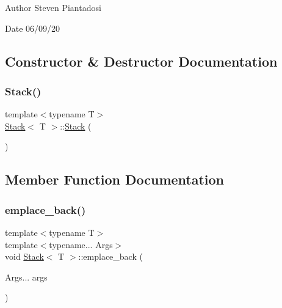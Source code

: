 \begin{DoxyAuthor}{Author}
Steven Piantadosi 
\end{DoxyAuthor}
\begin{DoxyDate}{Date}
06/09/20 
\end{DoxyDate}


\subsection{Constructor \& Destructor Documentation}
\mbox{\label{class_stack_aefee698059467258bbd79045aca62a63}} 
\subsubsection{\texorpdfstring{Stack()}{Stack()}}
{\footnotesize\ttfamily template$<$typename T$>$ \\
\hyperlink{class_stack}{Stack}$<$ T $>$\+::\hyperlink{class_stack}{Stack} (\begin{DoxyParamCaption}{ }\end{DoxyParamCaption})\hspace{0.3cm}{\ttfamily [inline]}}



\subsection{Member Function Documentation}
\mbox{\label{class_stack_a9f5e3b440e955d4c4e67203d8ad589c0}} 
\subsubsection{\texorpdfstring{emplace\+\_\+back()}{emplace\_back()}}
{\footnotesize\ttfamily template$<$typename T$>$ \\
template$<$typename... Args$>$ \\
void \hyperlink{class_stack}{Stack}$<$ T $>$\+::emplace\+\_\+back (\begin{DoxyParamCaption}\item[{Args...}]{args }\end{DoxyParamCaption})\hspace{0.3cm}{\ttfamily [inline]}}

\mbox{\label{class_stack_a275d43ff89b91a9c6c5636cc8539d285}} 

